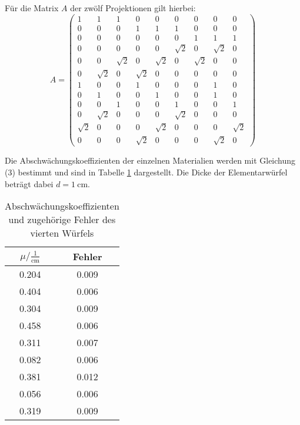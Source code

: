 Für die Matrix $A$ der zwölf Projektionen gilt hierbei:
$$ A =
\left( \begin{matrix}
       1       & 1 &       1 &       0 &        0 &       0 &       0 &       0 &        0      \\
       0       & 0 &       0 &       1 &        1 &       1 &       0 &       0 &        0      \\
       0       & 0 &       0 &       0 &        0 &       0 &       1 &       1 &        1      \\
       0       & 0 &       0 &       0 &        0 &       \sqrt{2}& 0 &       \sqrt{2}&  0      \\
       0       & 0 &       \sqrt{2}& 0 &        \sqrt{2}& 0 &      \sqrt{2}&  0 &       0      \\
       0       & \sqrt{2}& 0 &      \sqrt{2}&   0 &       0 &       0 &       0 &       0      \\
       1       & 0 &       0 &       1 &        0 &       0 &       0 &       1 &       0      \\
       0       & 1 &       0 &       0 &        1 &       0 &       0 &       1 &       0      \\
       0       & 0 &       1 &       0 &        0 &       1 &       0 &       0 &       1      \\
       0       & \sqrt{2}& 0 &       0 &        0 &       \sqrt{2}& 0 &       0 &       0      \\
       \sqrt{2}& 0 &       0 &       0 &        \sqrt{2}& 0 &       0 &       0 &       \sqrt{2}      \\
       0       & 0 &       0 &       \sqrt{2}&  0 &       0 &       0 &       \sqrt{2} & 0
\end{matrix} \right)
$$

Die Abschwächungskoeffizienten der einzelnen Materialien werden mit Gleichung (3) bestimmt und sind in Tabelle \ref{tab:blob} dargestellt.
Die Dicke der Elementarwürfel beträgt dabei $d=\SI{1}{\centi\meter}$.
\begin{table}[H]
  \centering
  \caption{Abschwächungskoeffizienten und zugehörige Fehler des vierten Würfels}
  \label{tab:blob}
  \begin{tabular}{c c}
    \toprule
    $\mu/ \mathrm{\frac{1}{cm}}$ & Fehler   \\
    \midrule
    0.204      &  0.009 \\
    0.404      &  0.006 \\
    0.304      &  0.009 \\
    0.458      &  0.006 \\
    0.311      &  0.007 \\
    0.082      &  0.006 \\
    0.381      &  0.012 \\
    0.056      &  0.006 \\
    0.319      &  0.009 \\
    \bottomrule
  \end{tabular}
\end{table}



